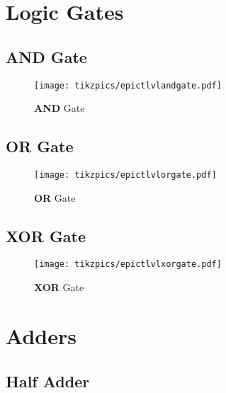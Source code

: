 \documentclass[a4paper, 10pt]{article}
\begin{document}


\def\gateTransistor{$BC547$}
\def\baseResistor{\SI{220}{k\ohm}}
\def\outResistor{\SI{47}{k\ohm}}
\def\ledResistor{\SI{18}{k\ohm}}
\def\vccPotential{$V_{CC}=\SI{5}{V}$}

\clearpage

\section{Logic Gates}

\subsection{AND Gate}

\begin{figure}[!ht]
	\centering
    \texttt{[image: tikzpics/epictlvlandgate.pdf]}
	\caption{\textbf{AND} Gate}
\end{figure}

\subsection{OR Gate}

\begin{figure}[!hb]
	\centering
    \texttt{[image: tikzpics/epictlvlorgate.pdf]}
	\caption{\textbf{OR} Gate}
\end{figure}

\subsection{XOR Gate}

\begin{figure}[!hp]
	\centering
    \texttt{[image: tikzpics/epictlvlxorgate.pdf]}
	\caption{\textbf{XOR} Gate}
\end{figure}

\clearpage

\section{Adders}

\subsection{Half Adder}
\end{document}
